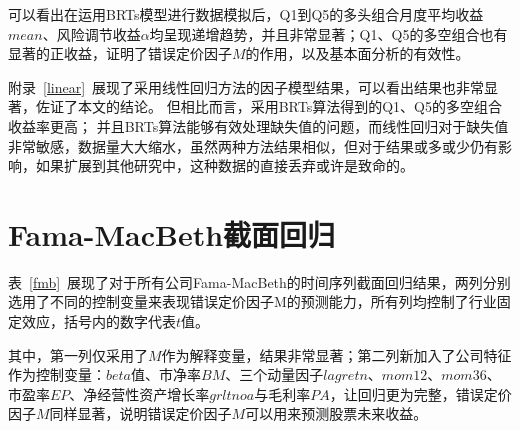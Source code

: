 可以看出在运用BRTs模型进行数据模拟后，Q1到Q5的多头组合月度平均收益$mean$、风险调节收益$\alpha$均呈现递增趋势，并且非常显著；Q1、Q5的多空组合也有显著的正收益，证明了错误定价因子$M$的作用，以及基本面分析的有效性。

附录~\ref{linear}~展现了采用线性回归方法的因子模型结果，可以看出结果也非常显著，佐证了本文的结论。
但相比而言，采用BRTs算法得到的Q1、Q5的多空组合收益率更高；
并且BRTs算法能够有效处理缺失值的问题，而线性回归对于缺失值非常敏感，数据量大大缩水，虽然两种方法结果相似，但对于结果或多或少仍有影响，如果扩展到其他研究中，这种数据的直接丢弃或许是致命的。

\section{Fama-MacBeth截面回归}\label{sfmb}
表~\ref{fmb}~展现了对于所有公司Fama-MacBeth的时间序列截面回归结果，两列分别选用了不同的控制变量来表现错误定价因子M的预测能力，所有列均控制了行业固定效应，括号内的数字代表$t$值。

其中，第一列仅采用了$M$作为解释变量，结果非常显著；第二列新加入了公司特征作为控制变量：$beta$值、市净率$BM$、三个动量因子$lagretn$、$mom12$、$mom36$、市盈率$EP$、净经营性资产增长率$grltnoa$与毛利率$PA$，让回归更为完整，错误定价因子$M$同样显著，说明错误定价因子$M$可以用来预测股票未来收益。

